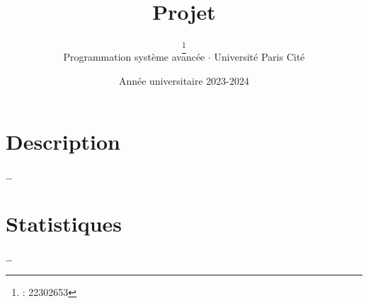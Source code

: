 \documentclass{article}
\title{\settitle}
\title{Projet}
\author{\anri\thanks{\anri : 22302653} \\
Programmation système avancée $\cdot$ Université Paris Cité}
\date{Année universitaire 2023-2024}
\begin{document}
\maketitle
\tableofcontents
\clearpage

\section{Description}
\dots

\section{Statistiques}
\dots
\end{document}
